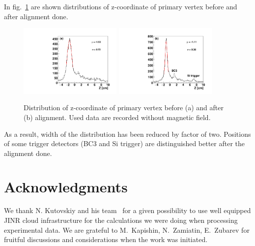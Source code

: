 \documentclass{webofc}
\begin{document}
In fig.~\ref{align} are shown distributions of z-coordinate of primary vertex before and after alignment done.
\begin{figure}[h]
  \centering
  \includegraphics[width=5cm,clip]{fig7a.pdf}
  \includegraphics[width=5cm,clip]{fig7b.pdf}
  \caption{Distribution of z-coordinate of primary vertex before (a) and after (b) alignment. Used data are recorded without magnetic field.}
  \label{align}       %
\end{figure}
As a result, width of the distribution has been reduced by factor of two. Positions of some trigger detectors (BC3 and Si trigger) are
distinguished better after the alignment done.  

\section*{Acknowledgments}
We thank N. Kutovskiy and his team~\cite{jinrCloud} for a given possibility to use well equipped JINR cloud infrastructure for the calculations we were doing when processing experimental data.
We are grateful to M.~Kapishin, N.~Zamiatin, E.~Zubarev for fruitful discussions and considerations when the work was initiated. 
\end{document}
